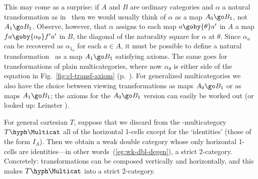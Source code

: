 This may come as a surprise: if $A$ and $B$ are ordinary categories and
$\alpha$ a natural transformation as in~ then we would
usually think of $\alpha$ as a map $A_0 \go B_1$, not $A_1 \go B_1$.
Observe, however, that $\alpha$ assigns to each map $a \goby{\theta} a'$ in
$A$ a map $fa \goby{\alpha_\theta} f'a'$ in $B$, the diagonal of the
naturality square for $\alpha$ at $\theta$.  Since $\alpha_a$ can be
recovered as $\alpha_{1_a}$ for each $a\in A$, it must be possible to
define a natural transformation~ as a map $A_1 \go B_1$
satisfying axioms.  The same goes for transformations of plain
multicategories, where now $\alpha_\theta$ is either side of the equation
in Fig.~\ref{fig:cl-transf-axiom} (p.~\pageref{fig:cl-transf-axiom}).  For
generalized multicategories we also have the choice between viewing
transformations as maps $A_0 \go B_1$ or as maps $A_1 \go B_1$; the axioms
for the $A_0 \go B_1$ version can easily be worked out (or looked up:
Leinster \cite[1.1.1]{GECM}).  

For general cartesian $T$, suppose that we discard from the
\fc-multicategory $T\hyph\Multicat$ all of the horizontal 1-cells except
for the `identities' (those of the form $I_A$).  Then we obtain a weak
double category whose only horizontal 1-cells are identities---in other
words~(\ref{eg:wk-dbl-degen}), a strict 2-category.  Concretely:
transformations can be composed vertically and horizontally, and this makes
$T\hyph\Multicat$%
% 
% 
into a strict 2-category.





